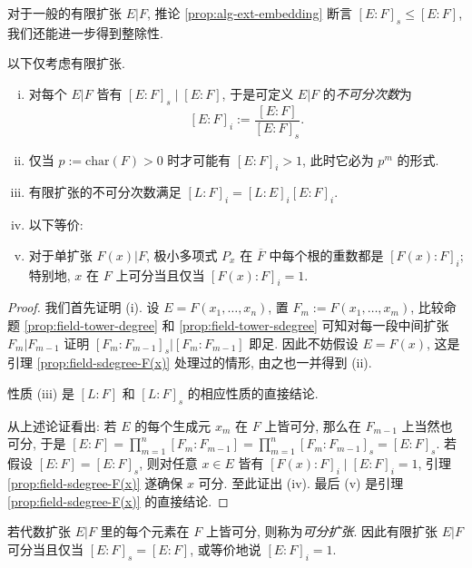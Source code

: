 对于一般的有限扩张 $E|F$, 推论 \ref{prop:alg-ext-embedding} 断言 $[E:F]_s \leq [E:F]$, 我们还能进一步得到整除性.
\begin{definition-theorem}\label{def:insep-deg}
	以下仅考虑有限扩张.
	\begin{enumerate}[(i)]
		\item 对每个 $E|F$ 皆有 $[E:F]_s \mid [E:F]$, 于是可定义 $E|F$ 的\emph{不可分次数}为 
			\[ [E:F]_i := \frac{[E:F]}{[E:F]_s}. \]
		\item 仅当 $p := \text{char}(F) > 0$ 时才可能有 $[E:F]_i > 1$, 此时它必为 $p^m$ 的形式.
		\item 有限扩张的不可分次数满足 $[L:F]_i = [L:E]_i [E:F]_i$.
		\item 以下等价:
		\item 对于单扩张 $F(x)|F$, 极小多项式 $P_x$ 在 $\overline{F}$ 中每个根的重数都是 $[F(x):F]_i$; 特别地, $x$ 在 $F$ 上可分当且仅当 $[F(x):F]_i = 1$.
	\end{enumerate}
\end{definition-theorem}
\begin{proof}
	我们首先证明 (i). 设 $E = F(x_1, \ldots, x_n)$, 置 $F_m := F(x_1, \ldots, x_m)$, 比较命题 \ref{prop:field-tower-degree} 和 \ref{prop:field-tower-sdegree} 可知对每一段中间扩张 $F_m|F_{m-1}$ 证明 $[F_m:F_{m-1}]_s | [F_m:F_{m-1}]$ 即足. 因此不妨假设 $E = F(x)$, 这是引理 \ref{prop:field-sdegree-F(x)} 处理过的情形, 由之也一并得到 (ii).
	
	性质 (iii) 是 $[L:F]$ 和 $[L:F]_s$ 的相应性质的直接结论.

	从上述论证看出: 若 $E$ 的每个生成元 $x_m$ 在 $F$ 上皆可分, 那么在 $F_{m-1}$ 上当然也可分, 于是 $[E:F] = \prod_{m=1}^n [F_m : F_{m-1}] = \prod_{m=1}^n [F_m : F_{m-1}]_s = [E:F]_s$. 若假设 $[E:F]=[E:F]_s$, 则对任意 $x \in E$ 皆有 $[F(x):F]_i \mid [E:F]_i = 1$, 引理 \ref{prop:field-sdegree-F(x)} 遂确保 $x$ 可分. 至此证出 (iv). 最后 (v) 是引理 \ref{prop:field-sdegree-F(x)} 的直接结论.
\end{proof}

\begin{definition}
	若代数扩张 $E|F$ 里的每个元素在 $F$ 上皆可分, 则称为\emph{可分扩张}. 因此有限扩张 $E|F$ 可分当且仅当 $[E:F]_s = [E:F]$, 或等价地说 $[E:F]_i = 1$.
\end{definition}

